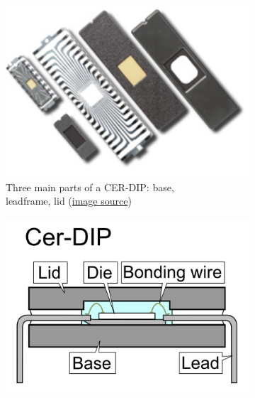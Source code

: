 \documentclass[final]{cubedoc}
\begin{document}
	
	\begin{figure}[h!]
		\centering
		\begin{subfigure}{.5\textwidth}
			\centering
			\includegraphics[height=0.2\textheight, width=\textwidth, keepaspectratio]{docs/cer_dip_real.png}
			\caption{Three main parts of a CER-DIP: base,\\ 
				leadframe, lid  \small{(\href{https://web.archive.org/web/20200818153119/https://www.spectrum-semi.com/cerdip}{image source}})}
			\label{fig:sub1}
		\end{subfigure}%
		\begin{subfigure}{.5\textwidth}
			\centering
			\includegraphics[height=0.2\textheight, width=\textwidth, keepaspectratio]{docs/cdip.PNG}

\end{subfigure}
\end{figure}
\end{document}

